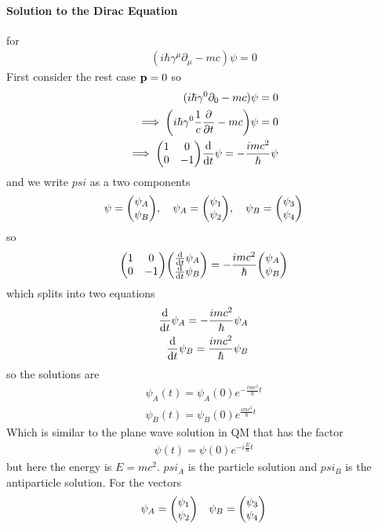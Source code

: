 \documentclass[../main.tex]{subfiles}
\begin{document}
\paragraph*{Solution to the Dirac Equation} for
\begin{align*}
    (i\hbar \gamma^\mu \partial_\mu - mc) \psi = 0
\end{align*}
First consider the rest case $\vb p = 0$ so
\begin{align*}
    (i\hbar \gamma^0 \partial_0 - mc) \psi = 0 \\
    \implies \qt(i\hbar \gamma^0 \frac{1}{c} \pdv{t} - mc) \psi = 0 \\
    \implies \mqty(1 & 0 \\ 0 & -1) \dv{t} \psi =-\frac{imc^2}{\hbar} \psi
\end{align*}
and we write $psi$ as a two components
\begin{align*}
    \psi = \mqty(\psi_A \\ \psi_B), \quad \psi_A = \mqty(\psi_1 \\ \psi_2), \quad \psi_B = \mqty(\psi_3 \\ \psi_4)
\end{align*}
so
\begin{align*}
    \mqty(1 & 0 \\ 0 & -1) \mqty(\dv{t} \psi_A \\ \dv{t} \psi_B) = -\frac{imc^2}{\hbar} \mqty(\psi_A \\ \psi_B)
\end{align*}
which splits into two equations
\begin{align*}
    \dv{t} \psi_A = -\frac{imc^2}{\hbar} \psi_A \\
    \dv{t} \psi_B = \frac{imc^2}{\hbar} \psi_B
\end{align*}
so the solutions are
\begin{align*}
    \psi_A(t) = \psi_A(0) e^{-\frac{imc^2}{\hbar} t} \\
    \psi_B(t) = \psi_B(0) e^{\frac{imc^2}{\hbar} t}
\end{align*}
Which is similar to the plane wave solution in QM that has the factor
\begin{align*}
    \psi(t) = \psi(0) e^{- i \frac{E}{\hbar} t}
\end{align*}
but here the energy is $E = mc^2$. $psi_A$ is the particle solution and $psi_B$ is the antiparticle
solution. For the vectors
\begin{align*}
    \psi_A = \mqty(\psi_1 \\ \psi_2) \quad \psi_B = \mqty(\psi_3 \\ \psi_4)
\end{align*}
\end{document}
